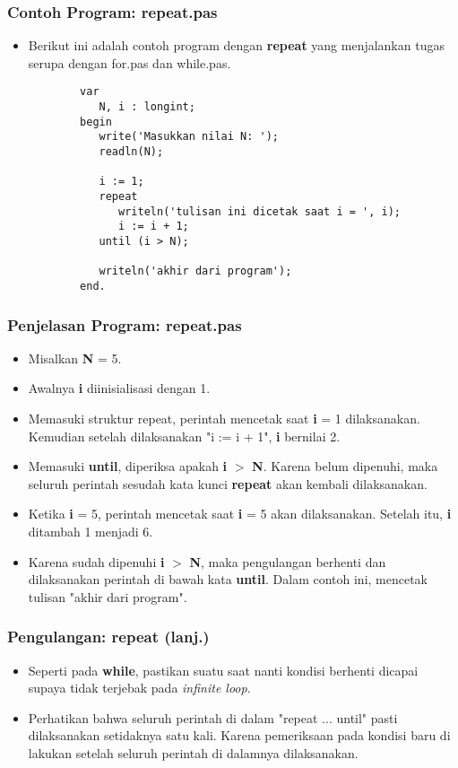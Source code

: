 \documentclass{beamer}
\begin{document}
\begin{frame}[fragile]
\frametitle{Contoh Program: repeat.pas}
\begin{itemize}
    \item Berikut ini adalah contoh program dengan \textbf{repeat} yang menjalankan tugas serupa dengan for.pas dan while.pas.
    \begin{lstlisting}
        var
           N, i : longint;
        begin
           write('Masukkan nilai N: ');
           readln(N);

           i := 1;
           repeat
              writeln('tulisan ini dicetak saat i = ', i);
              i := i + 1;
           until (i > N);

           writeln('akhir dari program');
        end.
    \end{lstlisting}
\end{itemize}
\end{frame}

\begin{frame}
\frametitle{Penjelasan Program: repeat.pas}
\begin{itemize}
    \item Misalkan \textbf{N} = 5.
    \item Awalnya \textbf{i} diinisialisasi dengan 1.
    \item Memasuki struktur repeat, perintah mencetak saat \textbf{i} = 1 dilaksanakan. Kemudian setelah dilaksanakan "i := i + 1", \textbf{i} bernilai 2.
    \item Memasuki \textbf{until}, diperiksa apakah \textbf{i} $>$ \textbf{N}. Karena belum dipenuhi, maka seluruh perintah sesudah kata kunci \textbf{repeat} akan kembali dilaksanakan.
    \item Ketika \textbf{i} = 5, perintah mencetak saat \textbf{i} = 5 akan dilaksanakan. Setelah itu, \textbf{i} ditambah 1 menjadi 6.
    \item Karena sudah dipenuhi \textbf{i} $>$ \textbf{N}, maka pengulangan berhenti dan dilaksanakan perintah di bawah kata \textbf{until}. Dalam contoh ini, mencetak tulisan "akhir dari program".
\end{itemize}
\end{frame}

\begin{frame}
\frametitle{Pengulangan: repeat (lanj.)}
\begin{itemize}
    \item Seperti pada \textbf{while}, pastikan suatu saat nanti kondisi berhenti dicapai supaya tidak terjebak pada \textit{infinite loop}.
    \item Perhatikan bahwa seluruh perintah di dalam "repeat ... until" \alert{pasti} dilaksanakan setidaknya satu kali. Karena pemeriksaan pada kondisi baru di lakukan setelah seluruh perintah di dalamnya dilaksanakan.
\end{itemize}
\end{frame}
\end{document}
